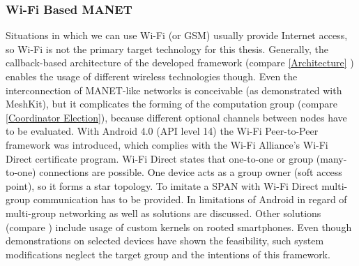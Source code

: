 	\subsubsection{Wi-Fi Based \gls{MANET}}
			
	Situations in which we can use Wi-Fi (or \gls{GSM}) usually provide Internet access, so Wi-Fi is not the primary target technology for this thesis. Generally, the callback-based architecture of the developed framework (compare \ref{Architecture} ) enables the usage of different wireless technologies though. Even the interconnection of \gls{MANET}-like networks is conceivable (as demonstrated with MeshKit), but it complicates the forming of the computation group (compare \ref{Coordinator Election}), because different optional channels between nodes have to be evaluated.
	With Android 4.0 (\gls{API} level 14) the Wi-Fi Peer-to-Peer framework was introduced, which complies with the Wi-Fi Alliance's Wi-Fi Direct certificate program. Wi-Fi Direct states that one-to-one or group (many-to-one) connections are possible. One device acts as a group owner (soft access point), so it forms a star topology. To imitate a \gls{SPAN} with Wi-Fi Direct multi-group communication has to be provided. In \textcite{Funai2015} limitations of Android in regard of multi-group networking as well as solutions are discussed.
	Other solutions (compare \textcite{Online:SPANProject}) include usage of custom kernels on rooted smartphones. Even though  demonstrations on selected devices have shown the feasibility, such system modifications neglect the target group and the intentions of this framework.
								
			
			
			

\FloatBarrier